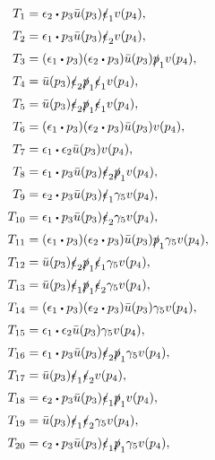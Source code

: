 \documentclass[12pt]{article}
\numberwithin{equation}{section}
\numberwithin{figure}{section}
\numberwithin{table}{section}
\newcommand{\ndot}{\mathrel{\raisebox{-2.3pt}{$ \!  \mathlarger{\mathlarger{\mathlarger{\mathlarger{\cdot}}}} \! $}}}
\begin{document}
        
	\begin{align*}
	  T_1 & =\epsilon_2\ndot p_3\bar{u}(p_3)\slashed{\epsilon}_1v(p_4),\\
          T_2 & =\epsilon_1\ndot p_3\bar{u}(p_3)\slashed{\epsilon}_2v(p_4),\\
          T_3 & =(\epsilon_1\ndot p_3)(\epsilon_2\ndot p_3)\bar{u}(p_3)\slashed{p}_1v(p_4),\\
          T_4 & =\bar{u}(p_3)\slashed{\epsilon}_2\slashed{p}_1\slashed{\epsilon}_1v(p_4),\\
          T_5 & =\bar{u}(p_3)\slashed{\epsilon}_2\slashed{p}_1\slashed{\epsilon}_1v(p_4),\\
          T_6 & =(\epsilon_1\ndot p_3)(\epsilon_2\ndot p_3)\bar{u}(p_3)v(p_4),\\
          T_7 & =\epsilon_1\ndot\epsilon_2\bar{u}(p_3)v(p_4),\\
          T_8 & =\epsilon_1\ndot p_3\bar{u}(p_3)\slashed{\epsilon}_2\slashed{p}_1v(p_4),\\
          T_9 & =\epsilon_2\ndot p_3\bar{u}(p_3)\slashed{\epsilon}_1\gamma_5v(p_4),\\
          T_{10} & =\epsilon_1\ndot p_3\bar{u}(p_3)\slashed{\epsilon}_2\gamma_5v(p_4),\\
          T_{11} & =(\epsilon_1\ndot p_3)(\epsilon_2\ndot p_3)\bar{u}(p_3)\slashed{p}_1\gamma_5v(p_4),\\
          T_{12} & =\bar{u}(p_3)\slashed{\epsilon}_2\slashed{p}_1\slashed{\epsilon}_1\gamma_5v(p_4),\\
          T_{13} & =\bar{u}(p_3)\slashed{\epsilon}_1\slashed{p}_1\slashed{\epsilon}_2\gamma_5v(p_4),\\
          T_{14} & =(\epsilon_1\ndot p_3)(\epsilon_2\ndot p_3)\bar{u}(p_3)\gamma_5v(p_4),\\
          T_{15} & =\epsilon_1\ndot\epsilon_2\bar{u}(p_3)\gamma_5v(p_4),\\
          T_{16} & =\epsilon_1\ndot p_3\bar{u}(p_3)\slashed{\epsilon}_2\slashed{p}_1\gamma_5v(p_4),\\
          T_{17} & =\bar{u}(p_3)\slashed{\epsilon}_1\slashed{\epsilon}_2v(p_4),\\
          T_{18} & =\epsilon_2\ndot p_3\bar{u}(p_3)\slashed{\epsilon}_1\slashed{p}_1v(p_4),\\
          T_{19} & =\bar{u}(p_3)\slashed{\epsilon}_1\slashed{\epsilon}_2\gamma_5v(p_4),\\
          T_{20} & =\epsilon_2\ndot p_3\bar{u}(p_3)\slashed{\epsilon}_1\slashed{p}_1\gamma_5v(p_4),\\
	\end{align*}
\end{document}
